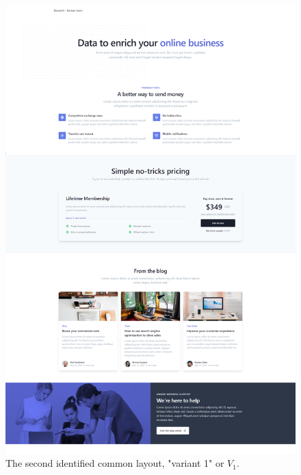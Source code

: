 \documentclass[conference]{IEEEtran}
\begin{document}
\begin{figure}[h]
\centering
\label{fig:variant1}
\includegraphics[width=\columnwidth]{media/hwVB0eKUehxy.png}
\caption{The second identified common layout, "variant 1" or \(V_1\).}
\end{figure}
\end{document}
